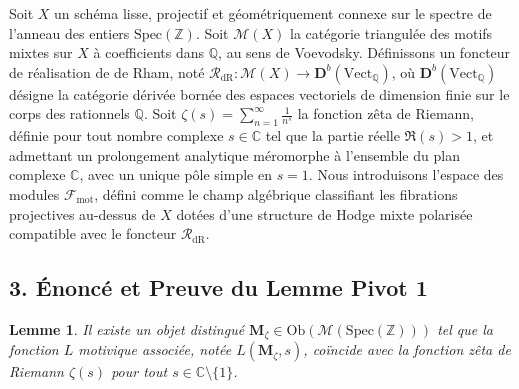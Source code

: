 \documentclass[
]{article}
\newtheorem{lemma}{Lemme}
\begin{document}
Soit \(X\) un schéma lisse, projectif et géométriquement connexe sur le
spectre de l'anneau des entiers \(\mathrm{Spec}(\mathbb{Z})\). Soit
\(\mathcal{M}(X)\) la catégorie triangulée des motifs mixtes sur \(X\) à
coefficients dans \(\mathbb{Q}\), au sens de Voevodsky. Définissons un
foncteur de réalisation de de Rham, noté
\(\mathcal{R}_{\mathrm{dR}} : \mathcal{M}(X) \rightarrow \mathbf{D}^b(\mathrm{Vect}_{\mathbb{Q}})\),
où \(\mathbf{D}^b(\mathrm{Vect}_{\mathbb{Q}})\) désigne la catégorie
dérivée bornée des espaces vectoriels de dimension finie sur le corps
des rationnels \(\mathbb{Q}\). Soit
\(\zeta(s) = \sum_{n=1}^{\infty} \frac{1}{n^s}\) la fonction zêta de
Riemann, définie pour tout nombre complexe \(s \in \mathbb{C}\) tel que
la partie réelle \(\Re(s) > 1\), et admettant un prolongement analytique
méromorphe à l'ensemble du plan complexe \(\mathbb{C}\), avec un unique
pôle simple en \(s=1\). Nous introduisons l'espace des modules
\(\mathcal{F}_{\mathrm{mot}}\), défini comme le champ algébrique
classifiant les fibrations projectives au-dessus de \(X\) dotées d'une
structure de Hodge mixte polarisée compatible avec le foncteur
\(\mathcal{R}_{\mathrm{dR}}\).

\hypertarget{uxe9noncuxe9-et-preuve-du-lemme-pivot-1}{%
\subsection{3. Énoncé et Preuve du Lemme Pivot
1}\label{uxe9noncuxe9-et-preuve-du-lemme-pivot-1}}

\begin{lemma}
Il existe un objet distingué
\(\mathbf{M}_{\zeta} \in \mathrm{Ob}(\mathcal{M}(\mathrm{Spec}(\mathbb{Z})))\)
tel que la fonction \(L\) motivique associée, notée
\(L(\mathbf{M}_{\zeta}, s)\), coïncide avec la fonction zêta de Riemann
\(\zeta(s)\) pour tout \(s \in \mathbb{C} \setminus \{1\}\).
\end{lemma}
\end{document}
